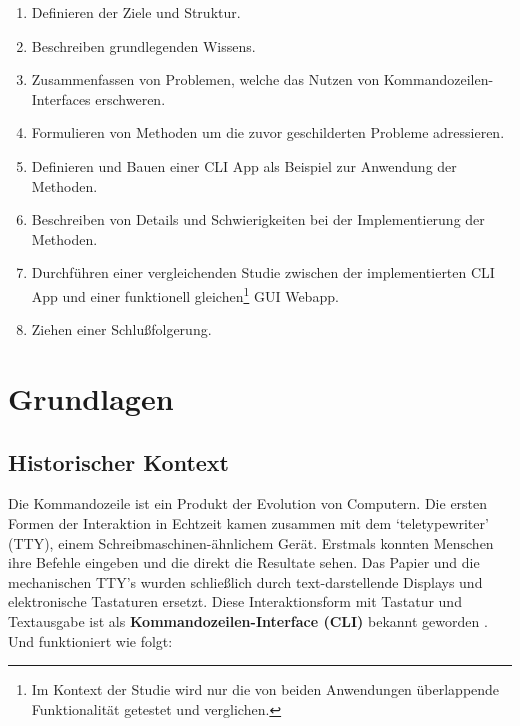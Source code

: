 \documentclass[oneside,bibliography=totocnumbered,BCOR=5mm]{scrbook}
\begin{document}
\begin{enumerate}
  \item \textbf{}
    \smallbreak
    Definieren der Ziele und Struktur.
  \item \textbf{}
    \smallbreak
    Beschreiben grundlegenden Wissens.
  \item \textbf{}
    \smallbreak
    Zusammenfassen von Problemen, welche das Nutzen von Kommandozeilen-Interfaces erschweren.
  \item \textbf{}
    \smallbreak
    Formulieren von Methoden um die zuvor geschilderten Probleme adressieren.
  \item \textbf{}
    \smallbreak
    Definieren und Bauen einer CLI App als Beispiel zur Anwendung der Methoden.
  \item \textbf{}
    \smallbreak
    Beschreiben von Details und Schwierigkeiten bei der Implementierung der Methoden.
  \item \textbf{}
    \smallbreak
    Durchführen einer vergleichenden Studie zwischen der implementierten CLI App
und einer funktionell gleichen\footnote{Im Kontext der Studie wird nur die von
beiden Anwendungen überlappende Funktionalität getestet und verglichen.} GUI
Webapp.
  \item \textbf{}
    \smallbreak
    Ziehen einer Schlußfolgerung.
\end{enumerate}

\chapter{Grundlagen}
\label{sec:grundlagen}

\section{Historischer Kontext}
\label{sec:historic-context}

Die Kommandozeile ist ein Produkt der Evolution von Computern. Die ersten
Formen der Interaktion in Echtzeit kamen zusammen mit dem `teletypewriter'
(TTY), einem Schreibmaschinen-ähnlichem Gerät. Erstmals konnten Menschen
ihre Befehle eingeben und die direkt die Resultate sehen. Das Papier und die
mechanischen TTY's wurden schließlich durch text-darstellende Displays und
elektronische Tastaturen ersetzt. Diese Interaktionsform mit Tastatur und
Textausgabe ist als \textbf{Kommandozeilen-Interface (CLI)} bekannt geworden
\parencite[35f]{nagarajan2018}. Und funktioniert wie folgt:
\end{document}
